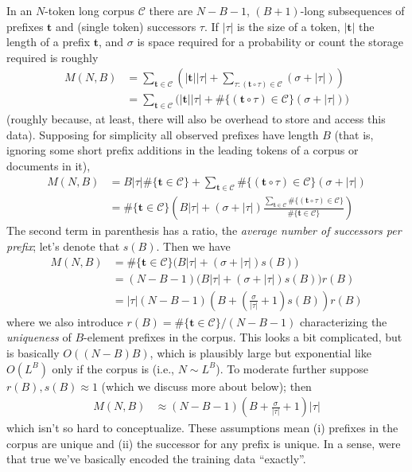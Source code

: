 \documentclass[11pt, oneside]{amsart}   	%
\begin{document}
In an $N$-token long corpus $\mathcal{C}$ there are $N-B-1$, $(B+1)$-long subsequences of prefixes $\mathbf{t}$ and (single token) successors $\tau$. If $|\tau |$ is the size of a token, $|\mathbf{t}|$ the length of a prefix $\mathbf{t}$, and $\sigma$ is space required for a probability or count the storage required is roughly
\begin{align*}
	M(N, B)
		&= \sum_{\mathbf{t} \in \mathcal{C}} \left( |\mathbf{t}| |\tau| + \sum_{\tau : (\mathbf{t}\circ\tau) \in \mathcal{C}} (\sigma + |\tau|) \right) \\
		&= \sum_{\mathbf{t} \in \mathcal{C}} \Big( |\mathbf{t}| |\tau| + \#\{(\mathbf{t}\circ\tau) \in \mathcal{C}\} (\sigma + |\tau|) \Big) 
\end{align*}
(roughly because, at least, there will also be overhead to store and access this data). Supposing for simplicity all observed prefixes have length $B$ (that is, ignoring some short prefix additions in the leading tokens of a corpus or documents in it), 
\begin{align*}
	M(N, B) &= B |\tau| \# \{ \mathbf{t} \in \mathcal{C} \} + \sum_{\mathbf{t} \in \mathcal{C}} \#\{(\mathbf{t}\circ\tau) \in \mathcal{C}\} (\sigma + |\tau|) \\
		&= \# \{ \mathbf{t} \in \mathcal{C} \} \left( 
			B |\tau|  + (\sigma + |\tau|) \frac{\sum_{\mathbf{t} \in \mathcal{C}} \#\{(\mathbf{t}\circ\tau) \in \mathcal{C}\}}{\# \{ \mathbf{t} \in \mathcal{C} \}} 
		\right)
\end{align*}
The second term in parenthesis has a ratio, the {\em average number of successors per prefix}; let's denote that $s(B)$. Then we have 
\begin{align*}
	M(N, B) &= \# \{ \mathbf{t} \in \mathcal{C} \} \Big( B |\tau|  + (\sigma + |\tau|) s(B) \Big) \\
		&= (N-B-1) \Big( B |\tau|  + (\sigma + |\tau|) s(B) \Big) r(B) \\
		&= |\tau| (N-B-1) \left( B + \left(\frac{\sigma}{|\tau|} + 1\right) s(B) \right) r(B) 
\end{align*}
where we also introduce $r(B) = \# \{ \mathbf{t} \in \mathcal{C} \}/(N-B-1)$ characterizing the {\em uniqueness} of $B$-element prefixes in the corpus. This looks a bit complicated, but is basically $O((N-B)B)$, which is plausibly large but exponential like $O(L^B)$ only if the corpus is (i.e., $N \sim L^B$). To moderate further suppose $r(B) , s(B) \approx 1$ (which we discuss more about below); then
\begin{align*}
	M(N, B) &\approx (N-B-1) \left( B + \frac{\sigma}{|\tau|} + 1 \right) |\tau| 
\end{align*}
which isn't so hard to conceptualize. These assumptions mean (i) prefixes in the corpus are unique and (ii) the successor for any prefix is unique. In a sense, were that true we've basically encoded the training data ``exactly''. 
\end{document}
